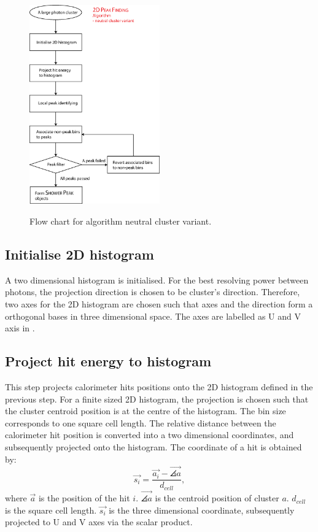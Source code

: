 \begin{figure}[tbph]
\centering
{\includegraphics[width=0.5\textwidth]{photon/2DpeakFinding}}
\caption[Flow chart for \peakFinding algorithm neutral cluster variant.]
{Flow chart for \peakFinding algorithm neutral cluster variant.}
\label{fig:photonPeakFindingFlowNeutral}
\end{figure}

\subsection{Initialise 2D histogram}


A two dimensional histogram is initialised. For the best resolving power between photons, the projection direction is chosen to be cluster's direction. Therefore, two axes for the 2D histogram are chosen such that axes and the direction form a orthogonal bases in three dimensional space. The axes are labelled as  U and V axis in .



\subsection{Project hit energy to histogram}

This step projects calorimeter hits positions onto the 2D histogram defined in the previous step. For a finite sized 2D histogram, the projection is chosen such that the cluster centroid position is at the centre of the histogram. The bin size corresponds to one \ECAL square cell length. The relative distance between the calorimeter hit position is converted into a two dimensional coordinates, and subsequently projected onto the histogram. The coordinate of a hit is obtained by:
\begin{equation}
\vec{s_{i}} = \frac{\vec{a_{i}} -  \vec{\angles{a}}}{d_{cell}},
\end{equation}
where $\vec{a}$ is the position of the hit $i$.  $\vec{\angles{a}}$ is the centroid position of cluster $a$. $d_{cell}$ is the  \ECAL square cell length. $\vec{s_{i}}$ is the three dimensional coordinate, subsequently projected to U and V axes via the scalar product.


